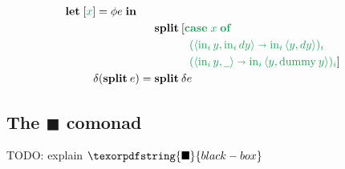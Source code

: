 \documentclass{rntz}\usepackage[a5]{rntzgeometry}\usepackage[fullwidth=130mm,width=330pt,]{narrow}
\newcommand\mathvar[1]{\ensuremath{#1}} %
\newcommand\todo[1]{{\color{ACMRed}#1}}
\newcommand\isocolor{\color{ForestGreen}} %
\newcommand\naive{na\"ive}
\newcommand\injc{\text{in}}
\newcommand\inj[1]{\injc_{#1}\,}
\newcommand\<{\mskip 4mu plus 4mu minus 1mu}
\newcommand\dx{\mathvar{dx}}
\newcommand\dy{\mathvar{dy}}
\newcommand\blackiso{{\texorpdfstring{\ensuremath{\blacksquare}}{black-box}}}
\newcommand\fname\text
\newcommand\dummy{\fname{dummy}}
\newcommand\kwname\textbf
\newcommand\ecase[1]{\kwname{case} \;{#1}\; \kwname{of}\;}
\newcommand\caseto\shortrightarrow
\newcommand\ebox[1]{[{#1}]}
\newcommand\elet[1]{\kwname{let}\;#1\;\kwname{in}\;}
\newcommand\eboxd[1]{\ebox{\isocolor #1}}
\newcommand\pwild{\underline{\phantom{a}}}
\newcommand\etuple[1]{\langle{#1}\rangle}
\newcommand\splitsum{\kwname{split}\<}
\begin{document}
\begin{figure*}
\begin{align*}
    \elet{\eboxd{x} = \phi e}\\
    &\phantom{{}={}} \splitsum [\isocolor \ecase x\\
    &\phantom{= \splitsum}\quad\isocolor
      (\etuple{\inj i y, \inj i \dy} \caseto \inj i \etuple{y,\dy})_i\\
    &\phantom{= \splitsum}\quad
      {\isocolor(\etuple{\inj i y, \pwild}
        \caseto \inj i \etuple{y, \dummy\<y})_i}]
    \\
    \delta(\splitsum e) &= \splitsum \delta e
  \end{align*}
  \caption{Semi\naive{} term translation}
\end{figure*}

\subsection{The \blackiso{} comonad}

\todo{TODO: explain $\blackiso$}
\end{document}
